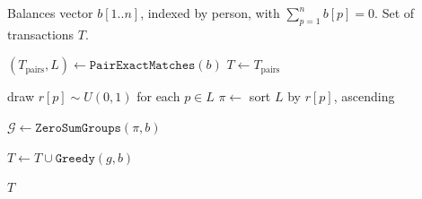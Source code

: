 \begin{algorithmic}[1]
    \INPUT  Balances vector $b[1..n]$, indexed by person, with $\sum_{p=1}^{n} b[p] = 0$.
    \OUTPUT Set of transactions $T$.

    \State $(T_{\text{pairs}}, L) \leftarrow \texttt{PairExactMatches}(b)$ 
    \State $T \leftarrow T_{\text{pairs}}$

    \State draw $r[p] \sim U(0,1)$ for each $p \in L$
    \State $\pi \leftarrow$ sort $L$ by $r[p]$, ascending

    \State $\mathcal{G} \leftarrow \texttt{ZeroSumGroups}(\pi, b)$ 

    \State $T \leftarrow T \cup \texttt{Greedy}(g, b)$
    \EndFor

    \State \Return $T$

\end{algorithmic}